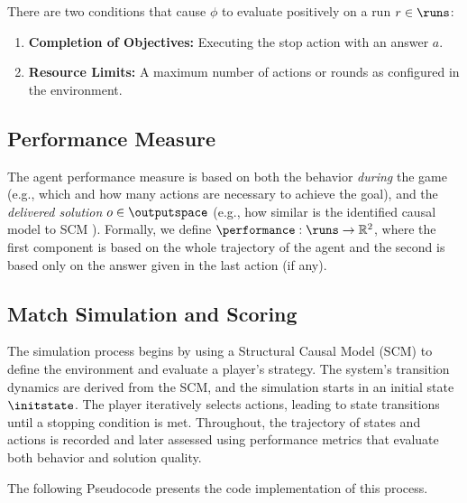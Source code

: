 \documentclass{uai2024} %
\begin{document}
        There are two conditions that cause $\phi$ to evaluate positively on a run $r \in \runs$:

        \begin{enumerate}
            \item \textbf{Completion of Objectives:} Executing the stop action with an answer $a$.
            \item \textbf{Resource Limits:} A maximum number of actions or rounds as configured in the environment.
        \end{enumerate}



    \subsection{Performance Measure}
        The agent performance measure \performance is based on both the behavior \emph{during} the game (e.g., which and how many actions are necessary to achieve the goal), and the \emph{delivered solution} $o \in \outputspace$ (e.g., how similar is the identified causal model to SCM \scm).
        Formally, we define $\performance: \runs \rightarrow \mathbb{R}^2$, where the first component is based on the whole trajectory of the agent and the second is based only on the answer given in the last action (if any).



    \subsection{Match Simulation and Scoring}
        The simulation process begins by using a Structural Causal Model (SCM) to define the environment and evaluate a player’s strategy. 
        The system’s transition dynamics are derived from the SCM, and the simulation starts in an initial state $\initstate$. 
        The player iteratively selects actions, leading to state transitions until a stopping condition is met. 
        Throughout, the trajectory of states and actions is recorded and later assessed using performance metrics that evaluate both behavior and solution quality.

    The following Pseudocode presents the code implementation of this process.
\end{document}
